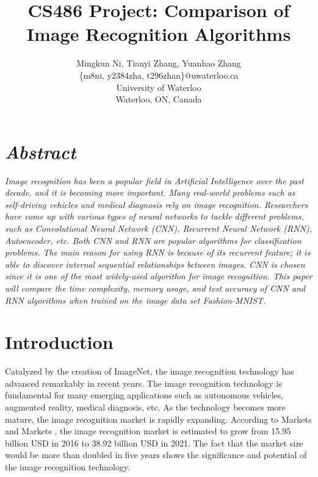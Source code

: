 \documentclass[letterpaper]{article} %
\begin{document}
	\title{CS486 Project: Comparison of Image Recognition Algorithms}
	\author{Mingkun Ni, Tianyi Zhang, Yuanhao Zhang\\
		\{m8ni, y2384zha, t296zhan\}@uwaterloo.ca\\
		University of Waterloo\\
		Waterloo, ON, Canada\\
	}
	\maketitle
	
	
	\section{\em{Abstract}}
	\textit{Image recognition has been a popular field in Artificial Intelligence over the past decade, and it is becoming more important. Many real-world problems such as self-driving vehicles and medical diagnosis rely on image recognition. Researchers have come up with various types of neural networks to tackle different problems, such as Convolutional Neural Network (CNN), Recurrent Neural Network (RNN), Autoencoder, etc. Both CNN and RNN are popular algorithms for classification problems. The main reason for using RNN is because of its recurrent feature; it is able to discover internal sequential relationships between images. CNN is chosen since it is one of the most widely-used algorithm for image recognition. This paper will compare the time complexity, memory usage, and test accuracy of CNN and RNN algorithms when trained on the image data set Fashion-MNIST.}
	
	
	\section{Introduction}
	Catalyzed by the creation of ImageNet, the image recognition technology has advanced remarkably in recent years. The image recognition technology is fundamental for many emerging applications such as autonomous vehicles, augmented reality, medical diagnosis, etc. As the technology becomes more mature, the image recognition market is rapidly expanding. According to Markets and Markets \cite{marketsandmarkets2017image}, the image recognition market is estimated to grow from 15.95 billion USD in 2016 to 38.92 billion USD in 2021. The fact that the market size would be more than doubled in five years shows the significance and potential of the image recognition technology.
	
\end{document}

